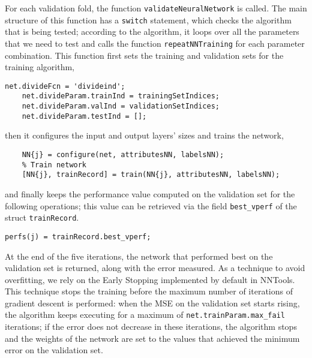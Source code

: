 \documentclass{article}
\begin{document}
For each validation fold, the function \verb$validateNeuralNetwork$ is called. The main structure of this function has a \verb$switch$ statement, which checks the algorithm that is being tested; according to the algorithm, it loops over all the parameters that we need to test and calls the function \verb$repeatNNTraining$ for each parameter combination. This function first sets the training and validation sets for the training algorithm,
\begin{lstlisting}[firstnumber=17]
    net.divideFcn = 'divideind';
    net.divideParam.trainInd = trainingSetIndices;
    net.divideParam.valInd = validationSetIndices;
    net.divideParam.testInd = [];
\end{lstlisting}
then it configures the input and output layers' sizes and trains the network,
\begin{lstlisting}[firstnumber=22]
    % Set up input and output layer
    NN{j} = configure(net, attributesNN, labelsNN);
    % Train network
    [NN{j}, trainRecord] = train(NN{j}, attributesNN, labelsNN);
\end{lstlisting}
and finally keeps the performance value computed on the validation set for the following operations; this value can be retrieved via the field \verb$best_vperf$ of the struct \verb$trainRecord$.
\begin{lstlisting}[firstnumber=30]
    perfs(j) = trainRecord.best_vperf;
\end{lstlisting}
At the end of the five iterations, the network that performed best on the validation set is returned, along with the error measured.
As a technique to avoid overfitting, we rely on the Early Stopping implemented by default in NNTools. This technique stops the training before the maximum number of iterations of gradient descent is performed: when the MSE on the validation set starts rising, the algorithm keeps executing for a maximum of \verb$net.trainParam.max_fail$ iterations; if the error does not decrease in these iterations, the algorithm stops and the weights of the network are set to the values that achieved the minimum error on the validation set.
\end{document}
